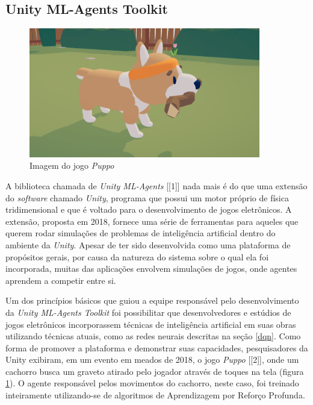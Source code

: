 \documentclass[cic,tc]{iiufrgs}
\begin{document}
\subsection{Unity ML-Agents Toolkit}

\begin{figure}[h]
    \caption{Imagem do jogo \textit{Puppo}}
    \begin{center}
      \includegraphics[width=0.9\textwidth]{puppo.png}
    \end{center}
    \label{fig:puppo}
\end{figure}


A biblioteca chamada de \textit{Unity ML-Agents} [[1]] nada mais é do que uma
extensão do \textit{software} chamado \textit{Unity}, programa que possui um
motor próprio de física tridimensional e que é voltado para o desenvolvimento de
jogos eletrônicos. A extensão, proposta em 2018, fornece uma série de
ferramentas para aqueles que querem rodar simulações de problemas de
inteligência artificial dentro do ambiente da \textit{Unity}. Apesar de ter sido
desenvolvida como uma plataforma de propósitos gerais, por causa da natureza
do sistema sobre o qual ela foi incorporada, muitas das aplicações envolvem
simulações de jogos, onde agentes aprendem a competir entre si.


Um dos princípios básicos que guiou a equipe responsável pelo desenvolvimento
da \textit{Unity ML-Agents Toolkit} foi possibilitar que desenvolvedores e
estúdios de jogos eletrônicos incorporassem técnicas de inteligência artificial
em suas obras utilizando técnicas atuais, como as redes neurais descritas na
seção \ref{dqn}. Como forma de promover a plataforma e demonstrar suas capacidades,
pesquisadores da Unity exibiram, em um evento em meados de 2018, o jogo
\textit{Puppo} [[2]], onde um cachorro busca um graveto atirado pelo jogador
através de toques na tela (figura \ref{fig:puppo}). O agente responsável pelos
movimentos do cachorro, neste caso, foi treinado inteiramente utilizando-se de
algoritmos de Aprendizagem por Reforço Profunda.
\end{document}
